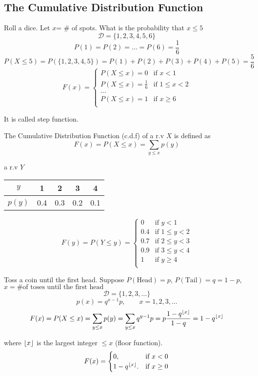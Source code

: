 \subsection{The Cumulative Distribution Function}
\begin{exmp}
Roll a dice. Let $x$= \# of spots. What is the probability that $x \leq 5$
\[	\mathcal{D}=\{1,2,3,4,5,6\}		\]
\[	P(1)=P(2)=\dots=P(6)=\frac{1}{6}		\]
\[	P(X \leq 5)=P(\{1,2,3,4,5\})=P(1)+P(2)+P(3)+P(4)+P(5)=\frac{5}{6}	\]
\[F(x)=\begin{cases}
P(X \leq x)=0 &\text{if } x < 1 \\
P(X \leq x)=\frac{1}{6} &\text{if } 1 \leq x < 2 \\
\dots \\
P(X \leq x)=1 &\text{if } x \geq 6 \\
\end{cases}\]

It is called step function.
\end{exmp}

\begin{defn}
The Cumulative Distribution Function (c.d.f) of a r.v $X$ is defined as 
\[	F(x)=P(X\leq x)=\sum_{y\leq x}p(y) \]
\end{defn}

\begin{exmp}
a r.v $Y$

\begin{center}
\begin{tabular}{c|cccc}
\hline
$y$  & 1 & 2 & 3 & 4\\
\hline
$p(y)$  & 0.4 & 0.3  & 0.2  & 0.1 \\
\hline
\end{tabular}
\end{center}


\[F(y)=P(Y\leq y)=\begin{cases}
0 &\text{if } y < 1 \\
0.4 &\text{if } 1 \leq y < 2 \\
0.7 &\text{if } 2 \leq y < 3 \\
0.9 &\text{if } 3 \leq y < 4 \\
1 &\text{if } y \geq 4 \\
\end{cases}
\]
\end{exmp}

\begin{exmp}
Toss a coin until the first head. Suppose $P(\text{Head})=p$, $P(\text{Tail})=q=1-p$, $x=\text{\# of toses until the first head}$
\[\mathcal{D}=\{1,2,3,\dots\}\]
\[p(x)=q^{x-1}p, \qquad x=1,2,3,\dots\]
\[F(x)=P(X \leq x)=\sum_{y \leq x}p(y)=\sum_{y \leq x}q^{y-1}p=p \frac{1-q^{\floor*{x}}}{1-q}=1-q^{\floor*{x}}\]

where $\floor*{x}$ is the largest integer $\leq x$ (floor function).
\[F(x)=\begin{cases}
0, & \text{if } x <0 \\
1-q^{\floor*{x}}. &\text{if } x\geq 0\\
\end{cases}\] 
\end{exmp}

